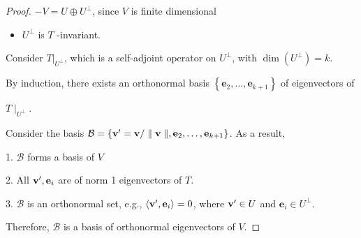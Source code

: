 \documentclass[11pt]{article}
\begin{document}
\begin{proof}
\(- V = U \oplus  {U}^{ \bot  }\), since \(V\) is finite dimensional

\begin{itemize}
\item \({U}^{ \bot  }\) is \(T\) -invariant.
\end{itemize}

Consider \({\left. T\right| }_{{U}^{ \bot  }}\), which is a self-adjoint operator on \({U}^{ \bot  }\), with \(\dim \left( {U}^{ \bot  }\right)  = k\).

By induction, there exists an orthonormal basis \(\left\{  {{\mathbf{e}}_2,\ldots ,{\mathbf{e}}_{k + 1}}\right\}\) of eigenvectors of

\(T{ \mid  }_{{U}^{ \bot  }}\).

Consider the basis \(\mathcal{B} = \left\{  {{\bf v}^{\prime } = \mathbf{v}/\parallel \mathbf{v}\parallel ,{\mathbf{e}}_2,\ldots ,{\mathbf{e}}_{k + 1}}\right\}\). As a result,

1. \(\mathcal{B}\) forms a basis of \(V\)

2. All \({\bf v}^{\prime },{\mathbf{e}}_{i}\) are of norm 1 eigenvectors of \(T\).

3. \(\mathcal{B}\) is an orthonormal set, e.g., \(\left\langle  {{\bf v}^{\prime },{\mathbf{e}}_{i}}\right\rangle   = 0\), where \({\bf v}^{\prime } \in  U\) and \({\mathbf{e}}_{i} \in  {U}^{ \bot  }\).

Therefore, \(\mathcal{B}\) is a basis of orthonormal eigenvectors of \(V\).
\end{proof}
\end{document}
